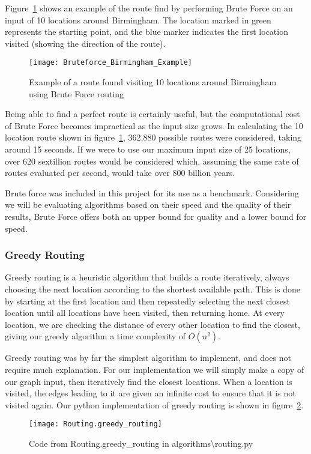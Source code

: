 \noindent
Figure~\ref{fig:Bruteforce_Birmingham_Example} shows an example of the route find by performing Brute Force on an input
of 10 locations around Birmingham.
The location marked in green represents the starting point, and the blue marker indicates the first location
visited (showing the direction of the route).
\begin{figure}[H]
    \centering
    \texttt{[image: Bruteforce\_Birmingham\_Example]}
    \caption{Example of a route found visiting 10 locations around Birmingham using Brute Force routing}
    \label{fig:Bruteforce_Birmingham_Example}
\end{figure}

\noindent
Being able to find a perfect route is certainly useful, but the computational cost of Brute Force becomes
impractical as the input size grows.
In calculating the 10 location route shown in figure~\ref{fig:Bruteforce_Birmingham_Example}, 362,880 possible routes
were considered, taking around 15 seconds.
If we were to use our maximum input size of 25 locations, over 620 sextillion routes would be considered \textemdash
which, assuming the same rate of routes evaluated per second, would take over 800 billion years.

Brute force was included in this project for its use as a benchmark.
Considering we will be evaluating algorithms based on their speed and the quality of their results, Brute Force offers
both an upper bound for quality and a lower bound for speed.

\subsubsection{Greedy Routing}\label{subsubsec:greedy-routing}
Greedy routing is a heuristic algorithm that builds a route iteratively, always choosing the next location according
to the shortest available path.
This is done by starting at the first location and then repeatedly selecting the next closest location until all
locations have been visited, then returning home.
At every location, we are checking the distance of every other location to find the closest, giving our greedy
algorithm a time complexity of $O(n^2)$.

\noindent
Greedy routing was by far the simplest algorithm to implement, and does not require much explanation.
For our implementation we will simply make a copy of our graph input, then iteratively find the closest locations.
When a location is visited, the edges leading to it are given an infinite cost to ensure that it is not visited again.
Our python implementation of greedy routing is shown in figure~\ref{fig:Routing.greedy_routing}.
\begin{figure}[H]
    \centering
    \texttt{[image: Routing.greedy\_routing]}
    \caption{Code from Routing.greedy\_routing in algorithms\textbackslash routing.py}
    \label{fig:Routing.greedy_routing}
\end{figure}

